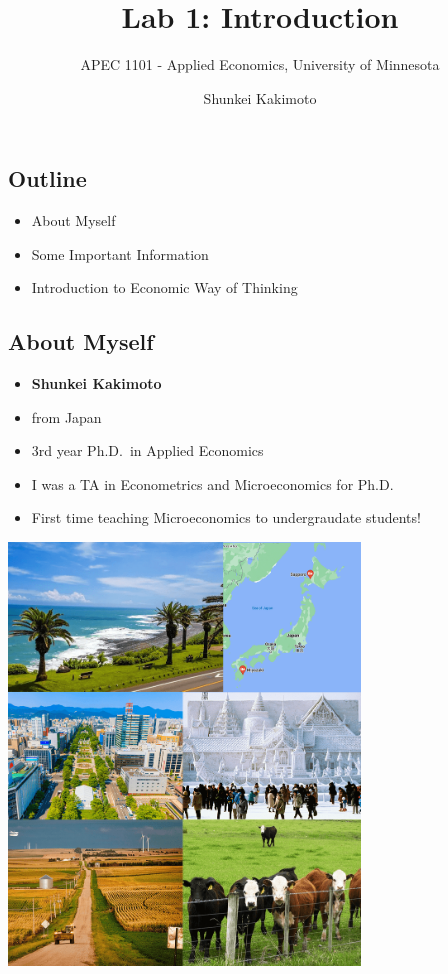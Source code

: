 \documentclass[
  letterpaper,
  DIV=11,
  numbers=noendperiod]{scrartcl}
\title{Lab 1: Introduction}
\subtitle{APEC 1101 - Applied Economics, University of Minnesota}
\author{Shunkei Kakimoto}
\date{}
\providecommand{\tightlist}{%
  \setlength{\itemsep}{0pt}\setlength{\parskip}{0pt}}\usepackage{longtable,booktabs,array}
\begin{document}
\maketitle


\subsection{\texorpdfstring{
Outline}{ Outline}}\label{outline}

\begin{itemize}
\tightlist
\item
  About Myself
\item
  Some Important Information
\item
  Introduction to Economic Way of Thinking
\end{itemize}

\subsection{About Myself}\label{about-myself}

\begin{itemize}
\tightlist
\item
  \textbf{Shunkei Kakimoto}
\item
  from Japan
\item
  3rd year Ph.D.~in Applied Economics
\end{itemize}

\begin{itemize}
\tightlist
\item
  I was a TA in Econometrics and Microeconomics for Ph.D.
\item
  First time teaching Microeconomics to undergraudate students!
\end{itemize}

\includegraphics[width=0.7\textwidth,height=\textheight]{image/pictures.png}
\end{document}
